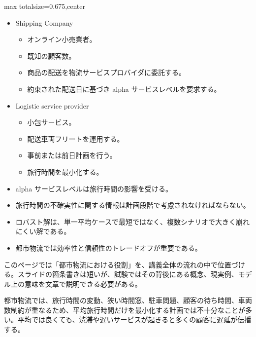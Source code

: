\clearpage
{}
\begin{adjustbox}{max totalsize={\textwidth}{0.675\textheight},center}
\begin{minipage}{\textwidth}\scriptsize
\begin{minipage}[t]{0.485\textwidth}
\begin{itemize}
\item Shipping Company
\begin{itemize}
\item オンライン小売業者。
\item 既知の顧客数。
\item 商品の配送を物流サービスプロバイダに委託する。
\item 約束された配送日に基づき alpha サービスレベルを要求する。
\end{itemize}
\item Logistic service provider
\begin{itemize}
\item 小包サービス。
\item 配送車両フリートを運用する。
\item 事前または前日計画を行う。
\item 旅行時間を最小化する。
\end{itemize}
\item alpha サービスレベルは旅行時間の影響を受ける。
\item 旅行時間の不確実性に関する情報は計画段階で考慮されなければならない。
\end{itemize}
\begin{itemize}
\item ロバスト解は、単一平均ケースで最短ではなく、複数シナリオで大きく崩れにくい解である。
\item 都市物流では効率性と信頼性のトレードオフが重要である。
\end{itemize}
\end{minipage}\hfill
\begin{minipage}[t]{0.485\textwidth}
このページでは「都市物流における役割」を、講義全体の流れの中で位置づける。スライドの箇条書きは短いが、試験ではその背後にある概念、現実例、モデル上の意味を文章で説明できる必要がある。\par
都市物流では、旅行時間の変動、狭い時間窓、駐車問題、顧客の待ち時間、車両数制約が重なるため、平均旅行時間だけを最小化する計画では不十分なことが多い。平均では良くても、渋滞や遅いサービスが起きると多くの顧客に遅延が伝播する。\par

\end{minipage}
\end{minipage}
\end{adjustbox}
